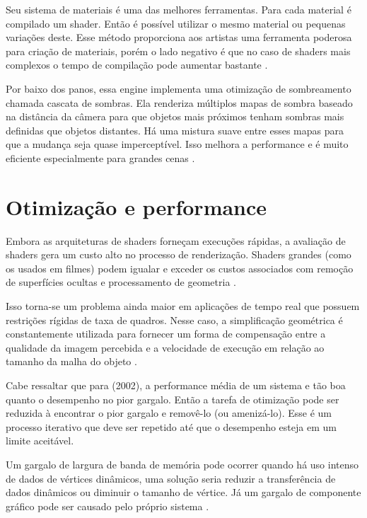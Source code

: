 Seu sistema de materiais é uma das melhores ferramentas. Para cada material é compilado um shader. Então é possível utilizar o mesmo material ou pequenas variações deste. Esse método proporciona aos artistas uma ferramenta poderosa para criação de materiais, porém o lado negativo é que no caso de shaders mais complexos o tempo de compilação pode aumentar bastante \cite{vsmid2017comparison}.

Por baixo dos panos, essa engine implementa uma otimização de sombreamento chamada cascata de sombras. Ela renderiza múltiplos mapas de sombra baseado na distância da câmera para que objetos mais próximos tenham sombras mais definidas que objetos distantes. Há uma mistura suave entre esses mapas para que a mudança seja quase imperceptível. Isso melhora a performance e é muito eficiente especialmente para grandes cenas \cite{vsmid2017comparison}. 

\section{Otimização e performance}
\label{sec:otimizacao-performance}

Embora as arquiteturas de shaders forneçam execuções rápidas, a avaliação de shaders gera um custo alto no processo de renderização. Shaders grandes (como os usados em filmes) podem igualar e exceder os custos associados com remoção de superfícies ocultas e processamento de geometria \cite{fabio2005user}. 

Isso torna-se um problema ainda maior em aplicações de tempo real que possuem restrições rígidas de taxa de quadros. Nesse caso, a simplificação geométrica é constantemente utilizada para fornecer um forma de compensação entre a qualidade da imagem percebida e a velocidade de execução em relação ao tamanho da malha do objeto \cite{fabio2005user}.

Cabe ressaltar que para  (2002), a performance média de um sistema e tão boa quanto o desempenho no pior gargalo. Então a tarefa de otimização pode ser reduzida à encontrar o pior gargalo e removê-lo (ou amenizá-lo). Esse é um processo iterativo que deve ser repetido até que o desempenho esteja em um limite aceitável.

Um gargalo de largura de banda de memória pode ocorrer quando há uso intenso de dados de vértices dinâmicos, uma solução seria reduzir a transferência de dados dinâmicos ou diminuir o tamanho de vértice. Já um gargalo de componente gráfico pode ser causado pelo próprio sistema \cite{riguer2002performance}.

